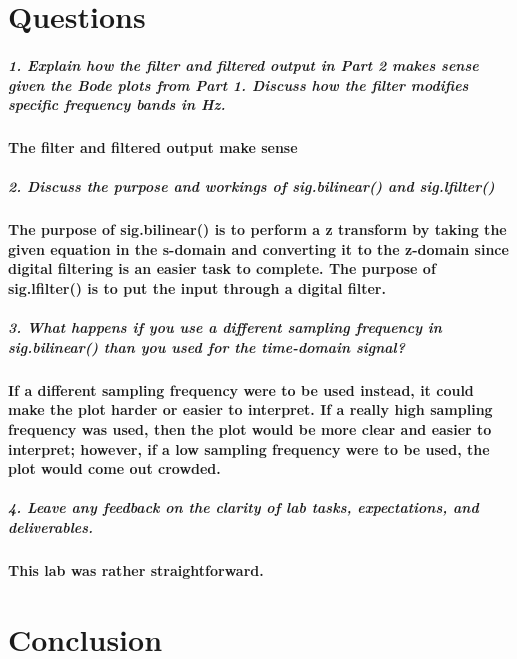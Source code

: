 \documentclass[12pt,a4paper]{article}
\begin{document}
\section{Questions}\label{sec:res}
\subparagraph{\large 1. Explain how the filter and filtered output in Part 2 makes sense given the Bode plots from Part 1. Discuss how the filter modifies specific frequency bands in Hz.}

\paragraph{The filter and filtered output make sense }

\subparagraph{\large 2. Discuss the purpose and workings of sig.bilinear() and sig.lfilter()}

\paragraph{The purpose of sig.bilinear() is to perform a z transform by taking the given equation in the s-domain and converting it to the z-domain since digital filtering is an easier task to complete. The purpose of sig.lfilter() is to put the input through a digital filter.}

\subparagraph{\large 3. What happens if you use a different sampling frequency in sig.bilinear() than you used for the time-domain signal?}

\paragraph{If a different sampling frequency were to be used instead, it could make the plot harder or easier to interpret. If a really high sampling frequency was used, then the plot would be more clear and easier to interpret; however, if a low sampling frequency were to be used, the plot would come out crowded.}

\subparagraph{\large 4. Leave any feedback on the clarity of lab tasks, expectations, and deliverables.}

\paragraph{This lab was rather straightforward.}

\section{Conclusion}\label{sec:res}
\end{document}
